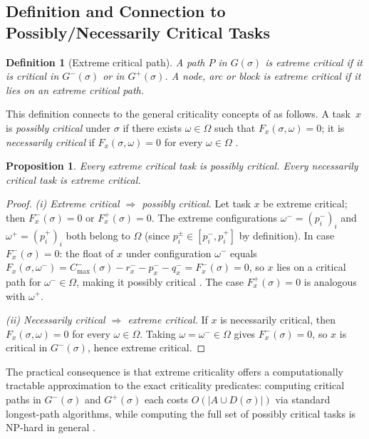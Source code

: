 \documentclass[preprint,12pt]{elsarticle}
\newtheorem{proposition}{Proposition}
\newtheorem{definition}{Definition}
\begin{document}
\subsection{Definition and Connection to Possibly/Necessarily Critical Tasks}
\label{sec:critdef}

\begin{definition}[Extreme critical path]
\label{def1}
A path $P$ in $G(\sigma)$ is \emph{extreme critical} if it is critical in $G^-(\sigma)$ or in $G^+(\sigma)$. A node, arc or block is extreme critical if it lies on an extreme critical path.
\end{definition}

This definition connects to the general criticality concepts of \cite{Fortin2010,Artigues2015} as follows. A task~$x$ is \emph{possibly critical} under $\sigma$ if there exists $\omega \in \Omega$ such that $F_x(\sigma,\omega)=0$; it is \emph{necessarily critical} if $F_x(\sigma,\omega)=0$ for every $\omega \in \Omega$ \cite{Fortin2010,Artigues2015}.

\begin{proposition}
\label{prop1}
Every extreme critical task is possibly critical. Every necessarily critical task is extreme critical.
\end{proposition}

\begin{proof}
\textit{(i) Extreme critical $\Rightarrow$ possibly critical.}
Let task $x$ be extreme critical; then $F_x^-(\sigma)=0$ or $F_x^+(\sigma)=0$.
The extreme configurations $\omega^- = (p_i^-)_{i}$ and $\omega^+ = (p_i^+)_{i}$ both belong to $\Omega$
(since $p_i^{\pm}\in[p_i^-,p_i^+]$ by definition).
In case $F_x^-(\sigma)=0$: the float of $x$ under configuration $\omega^-$ equals
$F_x(\sigma,\omega^-)=C^-_{\max}(\sigma)-r_x^- - p_x^- - q_x^- = F_x^-(\sigma)=0$,
so $x$ lies on a critical path for $\omega^-\in\Omega$, making it possibly critical \cite{Fortin2010,Artigues2015}.
The case $F_x^+(\sigma)=0$ is analogous with $\omega^+$.

\textit{(ii) Necessarily critical $\Rightarrow$ extreme critical.}
If $x$ is necessarily critical, then $F_x(\sigma,\omega)=0$ for every $\omega\in\Omega$.
Taking $\omega=\omega^-\in\Omega$ gives $F_x^-(\sigma)=0$, so $x$ is critical in $G^-(\sigma)$, hence extreme critical.
\end{proof}

\medskip

The practical consequence is that extreme criticality offers a computationally tractable approximation to the exact criticality predicates: computing critical paths in $G^-(\sigma)$ and $G^+(\sigma)$ each costs $O(|A \cup D(\sigma)|)$ via standard longest-path algorithms, while computing the full set of possibly critical tasks is NP-hard in general \cite{Fortin2010,Artigues2015}.
\end{document}

